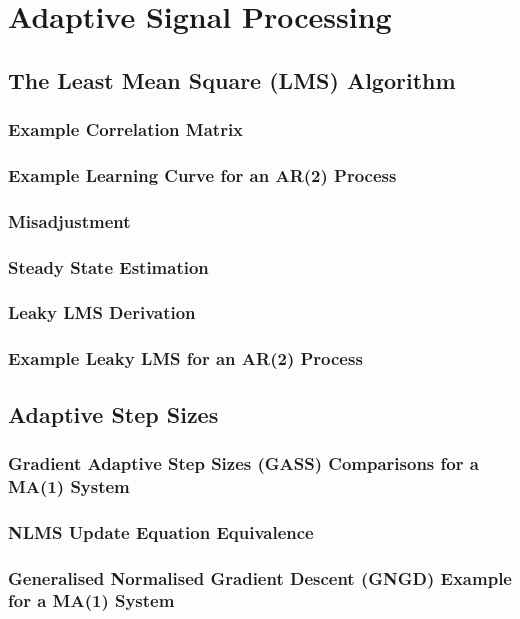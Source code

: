 \documentclass[12pt]{article}
\begin{document}
\pagebreak
\section{Adaptive Signal Processing} \label{sec: 2-ASP}
	\subsection{The Least Mean Square (LMS) Algorithm} \label{sec: 2-1-LMS}
		\subsubsection{Example Correlation Matrix}
		\subsubsection{Example Learning Curve for an AR(2) Process}
		\subsubsection{Misadjustment}
		\subsubsection{Steady State Estimation} 
		\subsubsection{Leaky LMS Derivation}
		\subsubsection{Example Leaky LMS for an AR(2) Process}  
	\subsection{Adaptive Step Sizes} \label{sec: 2-2-adaptive-step}
		\subsubsection{Gradient Adaptive Step Sizes (GASS) Comparisons for a MA(1) System} 
		\subsubsection{NLMS Update Equation Equivalence} 
		\subsubsection{Generalised Normalised Gradient Descent (GNGD) Example for a MA(1) System} 
\end{document}

